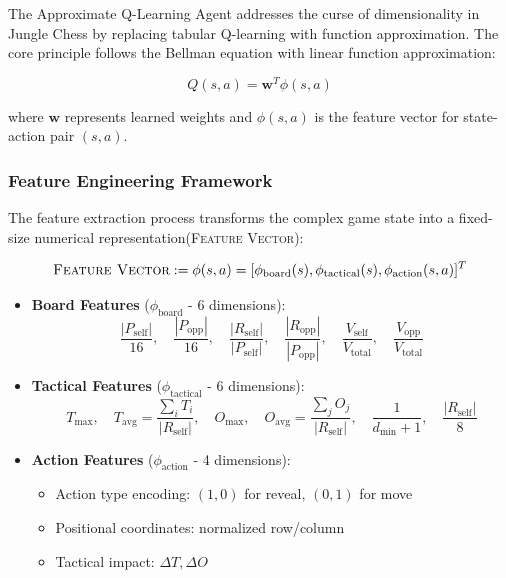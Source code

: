 \documentclass{article}
\begin{document}
The Approximate Q-Learning Agent addresses the curse of dimensionality in Jungle Chess by replacing tabular Q-learning with function approximation. The core principle follows the Bellman equation with linear function approximation:

\[
Q(s,a) = \mathbf{w}^T \phi(s,a)
\]

where $\mathbf{w}$ represents learned weights and $\phi(s,a)$ is the feature vector for state-action pair $(s,a)$.

\subsubsection{Feature Engineering Framework}


The feature extraction process transforms the complex game state into a fixed-size numerical representation(\textsc{Feature Vector}):

\[
\textsc{Feature Vector} := \phi(s,a) = [\phi_{\text{board}}(s), \phi_{\text{tactical}}(s), \phi_{\text{action}}(s,a)]^T
\]

\begin{itemize}
    \item \textbf{Board Features} ($\phi_{\text{board}}$ - 6 dimensions):
    \[
    \frac{|P_{\text{self}}|}{16},\quad \frac{|P_{\text{opp}}|}{16},\quad
    \frac{|R_{\text{self}}|}{|P_{\text{self}}|},\quad \frac{|R_{\text{opp}}|}{|P_{\text{opp}}|},\quad
    \frac{V_{\text{self}}}{V_{\text{total}}},\quad \frac{V_{\text{opp}}}{V_{\text{total}}}
    \]
    
    \item \textbf{Tactical Features} ($\phi_{\text{tactical}}$ - 6 dimensions):
    \[
    T_{\text{max}},\quad T_{\text{avg}} = \frac{\sum_i T_i}{|R_{\text{self}}|},\quad
    O_{\text{max}},\quad O_{\text{avg}} = \frac{\sum_j O_j}{|R_{\text{self}}|},\quad
    \frac{1}{d_{\text{min}} + 1},\quad \frac{|R_{\text{self}}|}{8}
    \]
    \item \textbf{Action Features} ($\phi_{\text{action}}$ - 4 dimensions):
    \begin{itemize}
        \item Action type encoding: $(1,0)$ for reveal, $(0,1)$ for move
        \item Positional coordinates: normalized row/column
        \item Tactical impact: $\Delta T, \Delta O$
    \end{itemize}
\end{itemize}
\end{document}
